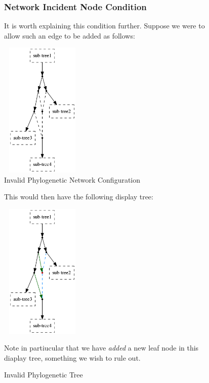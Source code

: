 \documentclass[11pt]{article}
\begin{document}
\begin{figure}
\subsubsection{Network Incident Node Condition}
It is worth explaining this condition further. Suppose we were to allow such an edge to be added as follows:

  \begin{center}
  \includegraphics[width=40mm, height=65mm]{disallowed-display-network1.png}
  \caption{Invalid Phylogenetic Network Configuration}
  \label{fig:disallowed-display-network1}
  \end{center}
\end{figure}


\begin{figure}
This would then have the following display tree:
  \begin{center}
  \includegraphics[width=40mm, height=65mm]{disallowed-display-tree1.png}
  \caption{Invalid Phylogenetic Tree}
  \label{fig:disallowed-display-tree1.png}
  \end{center}

Note in partiucular that we have \textit{added} a new leaf node in this diaplay tree, something we wish to rule out.
\end{figure}

\newpage
\singlespacing

%


%
\end{document}

